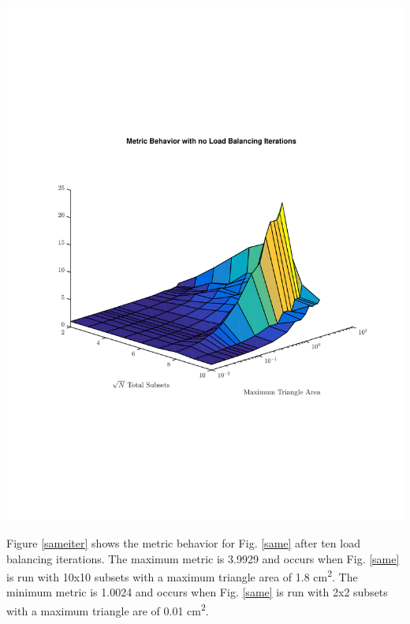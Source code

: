 \noindent\begin{minipage}{\textwidth}
\centering
\includegraphics[scale=0.78, trim = 2cm 6cm 2cm 7cm,clip]{figures/SameNoIter.pdf}
\label{samenoiter}
\end{minipage}
\smallskip

Figure \ref{sameiter} shows the metric behavior for Fig. \ref{same} after ten load balancing iterations. The maximum metric is 3.9929 and occurs when Fig. \ref{same} is run with 10x10 subsets with a maximum triangle area of 1.8 cm\textsuperscript{2}. The minimum metric is 1.0024 and occurs when Fig. \ref{same} is run with 2x2 subsets with a maximum triangle are of 0.01 cm\textsuperscript{2}.

